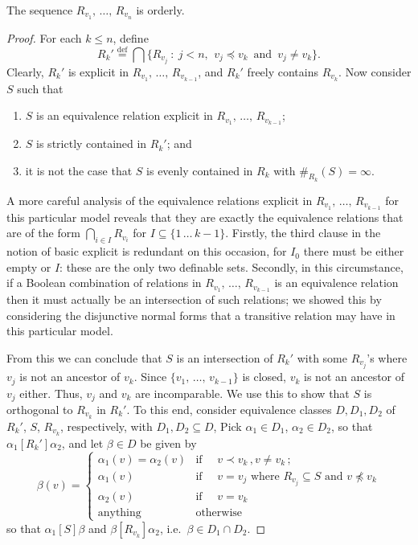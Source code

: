 \documentclass[AHL,Unicode,longabstracts,published]{cedram}
\newcommand*{\defeq}{\stackrel{\mathrm{def}}{=}}
\begin{document}
\begin{lemm}\label{lem: orderly}
The sequence $R_{v_1},\,\ldots,\,R_{v_n}$ is orderly.
\end{lemm}
\begin{proof}
For each $k \leq n$, define
\[
R_k'
\defeq \bigcap \big\{ R_{v_j}~:~j<n,\ \, v_j \preceq v_k \,\mbox{ and }\,v_j \neq v_k \big\}.
\]
Clearly, $R_k'$ is explicit in $R_{v_1},\,\ldots,\,R_{v_{k-1}}$, and $R_k'$ freely contains $R_{v_k}$. Now consider $S$ such that
\begin{enumerate}
\item $S$ is an equivalence relation explicit in $R_{v_1},\,\ldots,\,R_{v_{k-1}}$;
\item $S$ is strictly contained in $R_k'$; and
\item it is not the case that $S$ is evenly contained in $R_k$ with $\#_{R_k}(S) = \infty$.
\end{enumerate}
A more careful analysis of the equivalence relations explicit in $R_{v_1},\,\ldots,\,R_{v_{k-1}}$ for this particular model reveals that they are exactly the equivalence relations that are of the form $\bigcap_{i\in I} R_{v_i}$ for ${I\subseteq \{1\,\dots\,k-1\}}$. Firstly, the third clause in the notion of basic explicit is redundant on this occasion, for $I_0$ there must be either empty or $I$: these are the only two definable sets. Secondly, in this circumstance, if a Boolean combination of relations in $R_{v_1},\,\ldots,\,R_{v_{k-1}}$ is an equivalence relation then it must actually be an intersection of such relations; we showed this by considering the disjunctive normal forms that a transitive relation may have in this particular model.

From this we can conclude that $S$ is an intersection of $R_k'$ with some $R_{v_j}$'s where $v_j$ is not an ancestor of $v_k$. Since $\{v_1,\,\ldots,\,v_{k-1}\}$ is closed, $v_k$ is not an ancestor of $v_j$ either. Thus, $v_j$ and $v_k$ are incomparable. We use this to show that $S$ is orthogonal to $R_{v_k}$ in $R_k'$. To this end, consider equivalence classes $D, D_1, D_2$ of $R_k'$, $S$, $R_{v_k}$, respectively, with $D_1, D_2 \subseteq D$, Pick $\alpha_1\in D_1$, $\alpha_2\in D_2$, so that $\alpha_1\mathrel{[R_k']}\alpha_2$, and let $\beta\in D$ be given by
\[
\beta(v)=
\begin{cases}
\alpha_1(v)=\alpha_2(v)&\text{if }\quad v\prec v_k\,, v\neq v_k\,;\\
\alpha_1(v)&\text{if }\quad v=v_j\text{ where }R_{v_j}\subseteq S\text{ and }v\not\preceq v_k\\
\alpha_2(v)&\text{if }\quad v=v_k\\
\text{anything}&\text{otherwise}
\end{cases}
\]
so that $\alpha_1\mathrel {[S]} \beta$ and $\beta\mathrel {[R_{v_k}]} \alpha_2$, i.e.~$\beta\in D_1\cap D_2$.
\end{proof}
\end{document}
